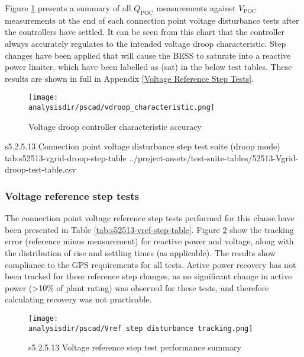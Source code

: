 \documentclass{../grid-link-report}
\newcommand{\projectassetsdir}{../project-assets}
\newcommand{\analysisdir}{report-assets/analysis}
\begin{document}
	Figure \ref{fig:s52513-vdroop-controller-accuracy} presents a summary of all $Q_{\mathrm{POC}}$ measurements against $V_{\mathrm{POC}}$ measurements at the end of each connection point voltage disturbance tests after the controllers have settled. It can be seen from this chart that the controller always accurately regulates to the intended voltage droop characteristic. Step changes have been applied that will cause the BESS to saturate into a reactive power limiter, which have been labelled as (sat) in the below test tables. These results are shown in full in Appendix \ref{Voltage Reference Step Tests}.
	
	\begin{figure}[H]
		\centering
		\texttt{[image: \\analysisdir/pscad/vdroop\_characteristic.png]}
		\caption{Voltage droop controller characteristic accuracy}
		\label{fig:s52513-vdroop-controller-accuracy}
	\end{figure}
	
	{
		\fontsize{9}{13}\selectfont
		\autoscaledlongtable
		{s5.2.5.13 Connection point voltage disturbance step test suite (droop mode)}
		{tab:s52513-vgrid-droop-step-table}
		{\projectassetsdir/test-suite-tables/52513-Vgrid-droop-test-table.csv}
	}
	

	\subsubsection{Voltage reference step tests}
	
	The connection point voltage reference step tests performed for this clause have been presented in Table \ref{tab:s52513-vref-step-table}. Figure \ref{fig:s52513-vref-step-summary-plot} show the tracking error (reference minus measurement) for reactive power and voltage, along with the distribution of rise and settling times (as applicable). The results show compliance to the GPS requirements for all tests. Active power recovery has not been tracked for these reference step changes, as no significant change in active power (>10\% of plant rating) was observed for these tests, and therefore calculating recovery was not practicable.
	
	
	\begin{figure}[H]
		\centering
		\texttt{[image: \\analysisdir/pscad/Vref step disturbance tracking.png]}
		\caption{s5.2.5.13 Voltage reference step test performance summary}
		\label{fig:s52513-vref-step-summary-plot}
	\end{figure}
\end{document}
